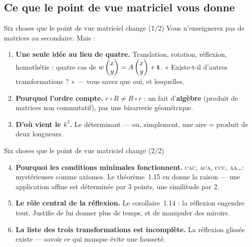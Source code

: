 \subsection{Ce que le point de vue matriciel vous donne}
\begin{frame}{Six choses que le point de vue matriciel change (1/2)}
  \small Vous n'enseignerez pas de matrices au secondaire. Mais :
  \begin{enumerate}
    \item \textbf{Une seule idée au lieu de quatre.} Translation,
      rotation, réflexion, homothétie : quatre cas de
      $w\begin{pmatrix}x\\ y\end{pmatrix}=A\begin{pmatrix}x\\ y\end{pmatrix}+\mathbf{t}$. « Existe-t-il d'autres
      transformations ? » --- vous savez que oui, et lesquelles.
    \item \textbf{Pourquoi l'ordre compte.} $r\circ R \neq R\circ r$ :
      un fait d'\textbf{algèbre} (produit de matrices non commutatif),
      pas une bizarrerie géométrique.
    \item \textbf{D'où vient le $k^2$.} Le déterminant --- ou,
      simplement, une aire = produit de deux longueurs.
    \end{enumerate}
\end{frame}

\begin{frame}{Six choses que le point de vue matriciel change (2/2)}
  \begin{enumerate}
    \setcounter{enumi}{3}
    \item \textbf{Pourquoi les conditions minimales fonctionnent.}
      \textsc{cac}, \textsc{aca}, \textsc{ccc}, \textsc{aa}\dots :
      mystérieuses comme axiomes. Le théorème~1.15 en donne la raison
      --- une application affine est déterminée par 3 points, une
      similitude par 2.
    \item \textbf{Le rôle central de la réflexion.} Le corollaire~1.14 :
      la réflexion engendre tout. Justifie de lui donner plus de
      temps, et de manipuler des miroirs.
    \item \textbf{La liste des trois transformations est incomplète.}
      La réflexion glissée existe --- savoir ce qui manque évite une
      fausseté.
  \end{enumerate}
\end{frame}


